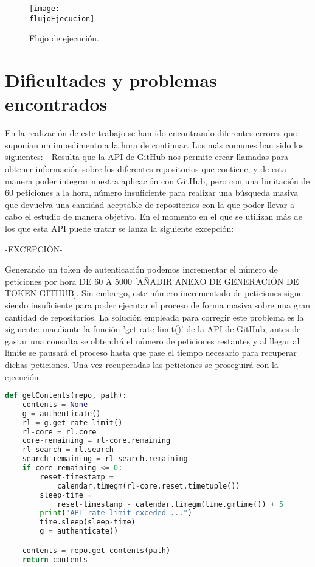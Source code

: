 \begin{figure}[h]
    \centering
    \texttt{[image: \\flujoEjecucion]}
    \caption{Flujo de ejecución.}
\end{figure}

\section{Dificultades y problemas encontrados}
En la realización de este trabajo se han ido encontrando diferentes errores que suponían un impedimento a la hora de continuar. Los más comunes han sido los siguientes:
- Resulta que la API de GitHub nos permite crear llamadas para obtener información sobre los diferentes repositorios que contiene, y de esta manera poder integrar nuestra aplicación con GitHub, pero con una limitación de 60 peticiones a la hora, número insuficiente para realizar una búsqueda masiva que devuelva una cantidad aceptable de repositorios con la que poder llevar a cabo el estudio de manera objetiva. En el momento en el que se utilizan más de los que esta API puede tratar se lanza la siguiente excepción: 

-EXCEPCIÓN-

Generando un token de autenticación podemos incrementar el número de peticiones por hora DE 60 A 5000 [AÑADIR ANEXO DE GENERACIÓN DE TOKEN GITHUB]. Sin embargo, este número incrementado de peticiones sigue siendo insuficiente para poder ejecutar el proceso de forma masiva sobre una gran cantidad de repositorios.
La solución empleada para corregir este problema es la siguiente: maediante la función 'get-rate-limit()' de la API de GitHub, antes de gastar una consulta se obtendrá el número de peticiones restantes y al llegar al límite se pausará el proceso hasta que pase el tiempo necesario para recuperar dichas peticiones. Una vez recuperadas las peticiones se proseguirá con la ejecución.

\begin{lstlisting}[language=Python, caption=Python example, label={lst:ejem1}]
def getContents(repo, path):
    contents = None
    g = authenticate()
    rl = g.get-rate-limit()
    rl-core = rl.core
    core-remaining = rl-core.remaining
    rl-search = rl.search
    search-remaining = rl-search.remaining
    if core-remaining <= 0:
        reset-timestamp = 
            calendar.timegm(rl-core.reset.timetuple())
        sleep-time = 
            reset-timestamp - calendar.timegm(time.gmtime()) + 5
        print("API rate limit exceded ...")
        time.sleep(sleep-time)
        g = authenticate()

    contents = repo.get-contents(path)
    return contents
\end{lstlisting}

